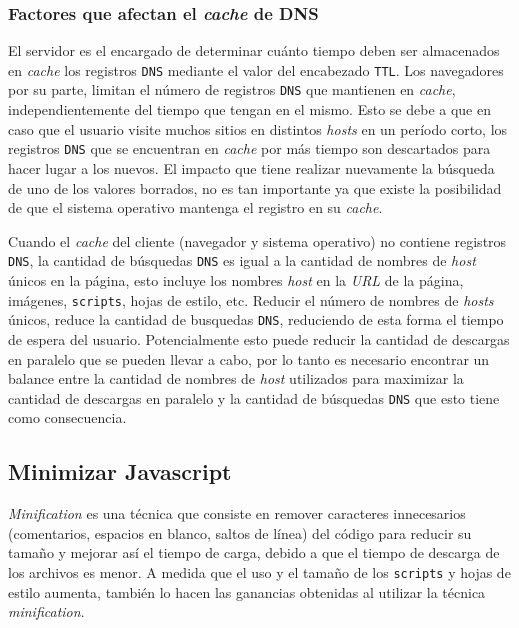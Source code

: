 \documentclass[a4paper,12pt]{report}
\begin{document}
\subsubsection{Factores que afectan el \emph{cache} de DNS}

El servidor es el encargado de determinar cuánto tiempo deben ser almacenados en \emph{cache} los registros \texttt{DNS} mediante el valor del encabezado \texttt{TTL}.
Los navegadores por su parte, limitan el número de registros \texttt{DNS} que
mantienen en \emph{cache}, independientemente del tiempo que tengan en el mismo.
Esto se debe a que en caso que el usuario visite muchos sitios en distintos \emph{hosts} en un período corto, los registros \texttt{DNS} que se encuentran en \emph{cache}
por más tiempo son descartados para hacer lugar a los nuevos. El impacto que tiene realizar nuevamente la búsqueda de uno de los valores borrados, no es tan importante
ya que existe la posibilidad de que el sistema operativo mantenga el registro en su \emph{cache}.

Cuando el \emph{cache} del cliente (navegador y sistema operativo) no contiene registros \texttt{DNS}, la cantidad de búsquedas \texttt{DNS} es igual a la cantidad de nombres de \emph{host}
únicos en la página, esto incluye los nombres \emph{host} en la \emph{URL} de la página, imágenes, \texttt{scripts}, hojas de estilo, etc. Reducir el número de nombres de \emph{hosts}
únicos, reduce la cantidad de busquedas \texttt{DNS}, reduciendo de esta forma el tiempo de espera del usuario.
Potencialmente esto puede reducir la cantidad de descargas en paralelo que se pueden llevar a cabo, por lo tanto es necesario
encontrar un balance entre la cantidad de nombres de \emph{host} utilizados para maximizar la cantidad de descargas en paralelo y la cantidad de búsquedas \texttt{DNS} que esto tiene
como consecuencia.

\subsection{Minimizar Javascript}

\emph{Minification} es una técnica que consiste en remover caracteres innecesarios (comentarios, espacios en blanco, saltos de línea)
del código para reducir su tamaño y mejorar así el tiempo de carga, debido a que el tiempo de descarga de los archivos es menor. A medida que el uso y el tamaño de los
\texttt{scripts} y hojas de estilo aumenta, también lo hacen las ganancias obtenidas al utilizar la técnica \emph{minification}.
\end{document}
